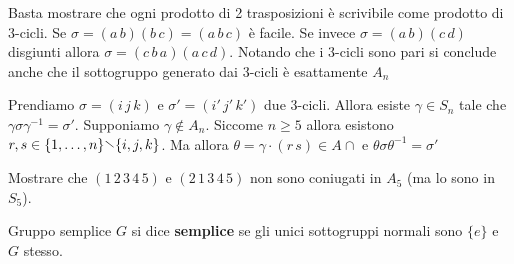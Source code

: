 \begin{remark} Basta mostrare che ogni prodotto di 2 trasposizioni è scrivibile
    come prodotto di 3-cicli. Se \(\sigma = (a\, b)(b\, c) = (a\, b\, c)\) è
    facile. Se invece \(\sigma = (a\, b)(c\, d)\) disgiunti allora \(\sigma =
    (c\,b\,a)(a\,c\,d)\). Notando che i 3-cicli sono pari si conclude anche che il
    sottogruppo generato dai 3-cicli è esattamente \(A_{n}\) 
\end{remark}

\begin{example} Prendiamo \(\sigma  = (i\,j\,k)\) e \(\sigma' = (i'\,j'\,k')\) due
    3-cicli. Allora esiste \(\gamma \in S_{n}\) tale che \(\gamma \sigma
    \gamma^{-1} = \sigma'\). Supponiamo \(\gamma \not\in A_{n}\). Siccome \(n
    \ge 5\) allora esistono \(r, s \in \{1, \dots, n\} \sminus \{i, j, k\}  \).
    Ma allora \(\theta = \gamma\cdot {(r\, s)} \in A\cap \) e \(\theta \sigma
    \theta^{-1} = \sigma'\)
\end{example}
\begin{eser} 
    Mostrare che \({(1\,2\,3\,4\,5)}\) e \({(2\,1\,3\,4\,5)}\) non sono
    coniugati in \(A_{5}\) (ma lo sono in \(S_{5}\)).
\end{eser}

\begin{definition}{Gruppo semplice}
    \(G\) si dice \textbf{semplice} se gli unici sottogruppi normali sono
    \(\{e\} \) e \(G\) stesso.
\end{definition}

